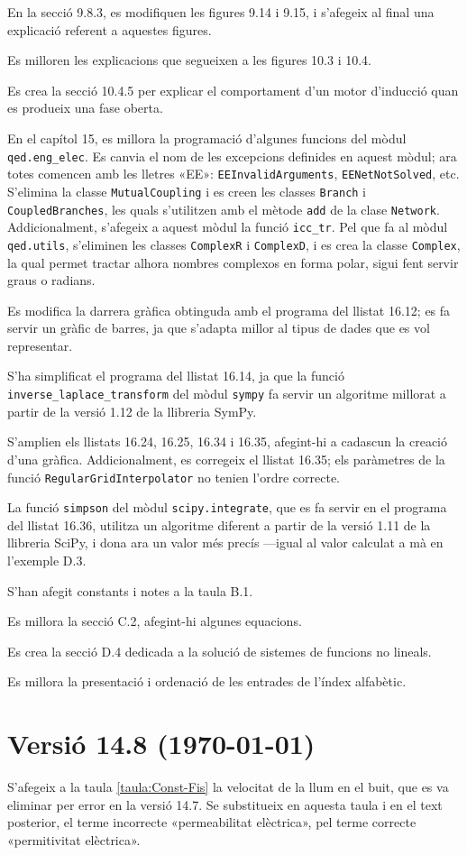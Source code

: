 En la secció 9.8.3, es modifiquen les figures 9.14 i 9.15, i s'afegeix al final una explicació referent a aquestes figures.

Es  milloren les explicacions que segueixen a les figures 10.3 i 10.4.


Es crea la secció 10.4.5 per explicar el comportament d'un motor d'inducció quan es produeix una fase oberta.

En el capítol 15, es millora la programació d'algunes funcions del mòdul  \texttt{qed.eng\_elec}. Es canvia el nom de les excepcions definides en aquest mòdul; ara totes comencen amb les lletres «EE»: \texttt{EEInvalidArguments}, \texttt{EENetNotSolved}, etc. S'elimina la classe \texttt{MutualCoupling} i es creen les classes \texttt{Branch} i \texttt{CoupledBranches}, les quals s'utilitzen amb el mètode \texttt{add} de la clase \texttt{Network}. Addicionalment, s'afegeix a aquest mòdul la funció \texttt{icc\_tr}. Pel que fa al mòdul \texttt{qed.utils}, s'eliminen les classes \texttt{ComplexR} i \texttt{ComplexD}, i es crea la classe \texttt{Complex}, la qual permet tractar alhora nombres complexos en forma polar, sigui fent servir graus o radians.

Es modifica la darrera gràfica obtinguda amb el programa del llistat  16.12; es fa servir un gràfic de barres,  ja que  s'adapta millor al tipus de dades que es vol representar.

S'ha simplificat el programa del llistat 16.14, ja que la funció
\texttt{inverse\_laplace\_transform} del mòdul \texttt{sympy} fa servir un algoritme millorat a partir de la versió 1.12 de la llibreria SymPy.


S'amplien els llistats 16.24, 16.25, 16.34 i 16.35, afegint-hi a cadascun la creació d'una gràfica. Addicionalment, es corregeix el llistat 16.35; els paràmetres de la funció \texttt{RegularGridInterpolator} no tenien l'ordre correcte.


La funció \texttt{simpson} del mòdul \texttt{scipy.integrate}, que es fa servir en el programa del llistat 16.36, utilitza un algoritme diferent  a partir  de la versió 1.11 de la llibreria SciPy, i dona  ara un valor més precís ---igual al valor calculat a mà en l'exemple D.3.


S'han afegit constants i  notes a la taula B.1.

Es millora la secció C.2, afegint-hi algunes equacions.

Es crea la secció D.4 dedicada a la solució de sistemes de funcions  no lineals.

Es millora la presentació i ordenació de les entrades de l'índex alfabètic.


\section*{Versió 14.8 (\today)}

S'afegeix a la taula \ref{taula:Const-Fis} la velocitat de la llum en el buit, que es va eliminar per error en la versió 14.7. Se substitueix en aquesta taula i en el text posterior, el terme incorrecte «permeabilitat elèctrica», pel terme correcte «permitivitat elèctrica».